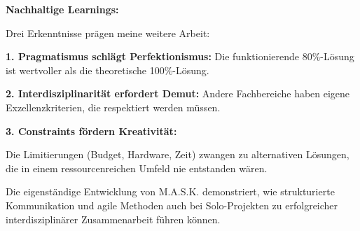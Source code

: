 \textbf{Nachhaltige Learnings:}

Drei Erkenntnisse prägen meine weitere Arbeit:

\textbf{1. Pragmatismus schlägt Perfektionismus:} Die funktionierende 80\%-Lösung ist wertvoller als die theoretische 100\%-Lösung.

\textbf{2. Interdisziplinarität erfordert Demut:} Andere Fachbereiche haben eigene Exzellenzkriterien, die respektiert werden müssen.

\textbf{3. Constraints fördern Kreativität:} \raggedright Die Limitierungen (Budget, Hardware, Zeit) zwangen zu alternativen Lösungen, die in einem ressourcenreichen Umfeld nie entstanden wären.

Die eigenständige Entwicklung von M.A.S.K. demonstriert, wie strukturierte Kommunikation und agile Methoden auch bei Solo-Projekten zu erfolgreicher interdisziplinärer Zusammenarbeit führen können.

